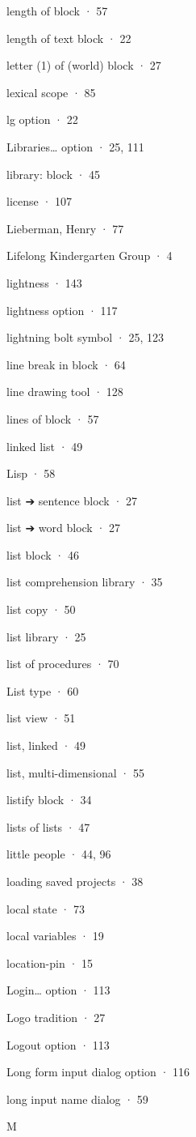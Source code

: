 length of block · 57

length of text block · 22

letter (1) of (world) block · 27

lexical scope · 85

lg option · 22

Libraries\ldots{} option · 25, 111

library: block · 45

license · 107

Lieberman, Henry · 77

Lifelong Kindergarten Group · 4

lightness · 143

lightness option · 117

lightning bolt symbol · 25, 123

line break in block · 64

line drawing tool · 128

lines of block · 57

linked list · 49

Lisp · 58

list ➔ sentence block · 27

list ➔ word block · 27

list block · 46

list comprehension library · 35

list copy · 50

list library · 25

list of procedures · 70

List type · 60

list view · 51

list, linked · 49

list, multi-dimensional · 55

listify block · 34

lists of lists · 47

little people · 44, 96

loading saved projects · 38

local state · 73

local variables · 19

location-pin · 15

Login\ldots{} option · 113

Logo tradition · 27

Logout option · 113

Long form input dialog option · 116

long input name dialog · 59

M

